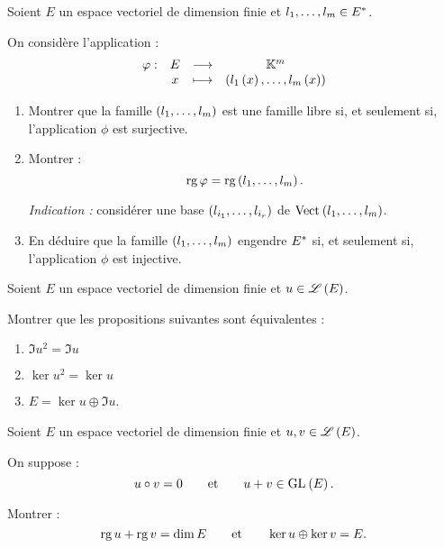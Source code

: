 \begin{exo}[Exercice 15]
Soient \(E\) un espace vectoriel de dimension finie et \(l_1,\dots,l_m\in E^{*}\).

On considère l'application : \[\begin{array}[t]{cccc}\varphi : & E & \longrightarrow & \mathbb{K}^m \\ & x & \longmapsto & \left(l_1\left(x\right),\dots,l_m\left(x\right)\right)\end{array}\]

\begin{enumerate}
\item Montrer que la famille \(\left(l_1,\dots,l_m\right)\) est une famille libre si, et seulement si, l'application \(\phi\) est surjective. \\

\item Montrer : \[\operatorname{rg}\varphi=\operatorname{rg}\left(l_1,\dots,l_m\right).\]

\textit{Indication :} considérer une base \(\left(l_{i_1},\dots,l_{i_r}\right)\) de \(\Vect{l_1,\dots,l_m}\). \\

\item En déduire que la famille \(\left(l_1,\dots,l_m\right)\) engendre \(E^{*}\) si, et seulement si, l'application \(\phi\) est injective.
\end{enumerate}
\end{exo}

\begin{corr}
\end{corr}

\begin{exo}[Exercice 16]
Soient \(E\) un espace vectoriel de dimension finie et \(u\in\mathscr{L}\left(E\right)\).

Montrer que les propositions suivantes sont équivalentes :

\begin{enumerate}
\item \(\Im u^2=\Im u\) \\

\item \(\ker u^2=\ker u\) \\

\item \(E=\ker u\oplus\Im u\).
\end{enumerate}
\end{exo}

\begin{corr}
\end{corr}

\begin{exo}[Exercice 17]
Soient \(E\) un espace vectoriel de dimension finie et \(u,v\in\mathscr{L}\left(E\right)\).

On suppose : \[u\rond v=0\qquad\text{et}\qquad u+v\in\GL{}[E].\]

Montrer : \[\operatorname{rg} u+\operatorname{rg} v=\dim E\qquad\text{et}\qquad\ker u\oplus\ker v=E.\]
\end{exo}

\begin{corr}
\end{corr}